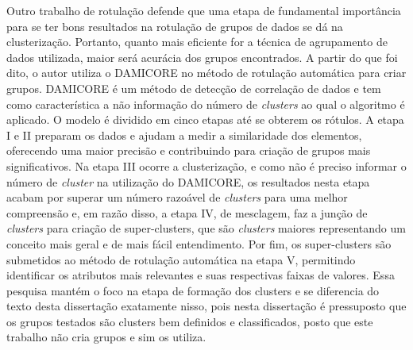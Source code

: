 Outro trabalho de rotulação \cite{araujo2017} defende que uma etapa de fundamental importância para se ter bons resultados na rotulação de grupos de dados se dá na clusterização. Portanto, quanto mais eficiente for a técnica de agrupamento de dados utilizada, maior será acurácia dos grupos encontrados. A partir do que foi dito, o autor utiliza o DAMICORE no método de rotulação automática para criar grupos. DAMICORE é um método de detecção de correlação de dados e tem como característica a não informação do número de \textit{clusters} ao qual o algoritmo é aplicado. O modelo é dividido em cinco etapas até se obterem os rótulos. A etapa I e II preparam os dados e ajudam a medir a similaridade dos elementos, oferecendo uma maior precisão e contribuindo para criação de grupos mais significativos. Na etapa III ocorre a clusterização, e como não é preciso informar o número de \textit{cluster} na utilização do DAMICORE, os resultados nesta etapa acabam por superar um número razoável de \textit{clusters} para uma melhor compreensão e, em razão disso, a etapa IV, de mesclagem, faz a junção de \textit{clusters} para criação de super-clusters, que são \textit{clusters} maiores representando um conceito mais geral e de mais fácil entendimento. Por fim, os super-clusters são submetidos ao método de rotulação automática na etapa V, permitindo identificar os atributos mais relevantes e suas respectivas faixas de valores. Essa pesquisa mantém o foco na etapa de formação dos clusters e se diferencia do texto desta dissertação exatamente nisso, pois nesta dissertação é pressuposto que os grupos testados são clusters bem definidos e classificados, posto que este trabalho não cria grupos e sim os utiliza. 

